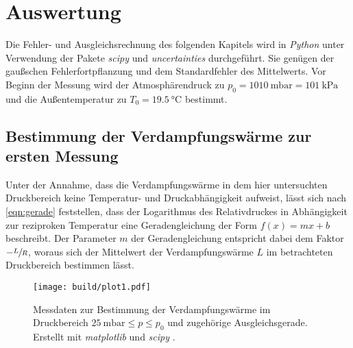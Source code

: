 \section{Auswertung}
\label{sec:Auswertung}
Die Fehler- und Ausgleichsrechnung des folgenden Kapitels wird in \textit{Python} unter Verwendung der Pakete \textit{scipy} \cite{scipy} und \textit{uncertainties}
\cite{uncertainties} durchgeführt. Sie genügen der gaußschen Fehlerfortpflanzung und dem Standardfehler des Mittelwerts.  
Vor Beginn der Messung wird der Atmosphärendruck zu $p_0 = \qty{1010}{\milli\bar} = \qty{101}{\kilo\pascal}$ und die Außentemperatur zu 
$T_0 = \qty{19.5}{\degreeCelsius}$ bestimmt.

\subsection{Bestimmung der Verdampfungswärme zur ersten Messung}
\label{subsec:A_L_Bestimmung}
Unter der Annahme, dass die Verdampfungswärme in dem hier untersuchten Druckbereich keine Temperatur- und Druckabhängigkeit aufweist, lässt sich nach \autoref{eqn:gerade}
feststellen, dass der Logarithmus des Relativdruckes in Abhängigkeit zur reziproken Temperatur eine Geradengleichung der Form $f(x) = mx + b$ beschreibt. 
Der Parameter $m$ der Geradengleichung entspricht dabei dem Faktor $-\sfrac{L}{R}$, woraus sich der Mittelwert der Verdampfungswärme $L$ im betrachteten Druckbereich bestimmen lässt.

\begin{figure}
    \centering
    \texttt{[image: build/plot1.pdf]}
    \caption{Messdaten zur Bestimmung der Verdampfungswärme im Druckbereich $\qty{25}{\milli\bar} \leq p \leq p_0$ und zugehörige Ausgleichsgerade. Erstellt mit 
    \textit{matplotlib} \cite{matplotlib} und \textit{scipy} \cite{scipy}.}
    \label{fig:plot1}
\end{figure}

